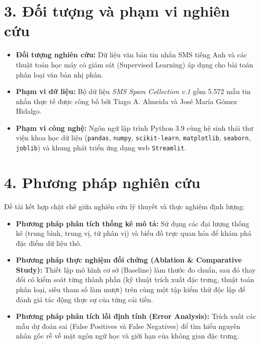 \documentclass[12pt,a4paper]{report}
\begin{document}
\section*{3. Đối tượng và phạm vi nghiên cứu}
\begin{itemize}
    \item \textbf{Đối tượng nghiên cứu:} Dữ liệu văn bản tin nhắn SMS tiếng Anh và các thuật toán học máy có giám sát (Supervised Learning) áp dụng cho bài toán phân loại văn bản nhị phân.
    \item \textbf{Phạm vi dữ liệu:} Bộ dữ liệu \textit{SMS Spam Collection v.1} gồm 5.572 mẫu tin nhắn thực tế được công bố bởi Tiago A. Almeida và José María Gómez Hidalgo.
    \item \textbf{Phạm vi công nghệ:} Ngôn ngữ lập trình Python 3.9 cùng hệ sinh thái thư viện khoa học dữ liệu (\texttt{pandas}, \texttt{numpy}, \texttt{scikit-learn}, \texttt{matplotlib}, \texttt{seaborn}, \texttt{joblib}) và khung phát triển ứng dụng web \texttt{Streamlit}.
\end{itemize}

\section*{4. Phương pháp nghiên cứu}
Đề tài kết hợp chặt chẽ giữa nghiên cứu lý thuyết và thực nghiệm định lượng:
\begin{itemize}
    \item \textbf{Phương pháp phân tích thống kê mô tả:} Sử dụng các đại lượng thống kê (trung bình, trung vị, tứ phân vị) và biểu đồ trực quan hóa để khám phá đặc điểm dữ liệu thô.
    \item \textbf{Phương pháp thực nghiệm đối chứng (Ablation \& Comparative Study):} Thiết lập mô hình cơ sở (Baseline) làm thước đo chuẩn, sau đó thay đổi có kiểm soát từng thành phần (kỹ thuật trích xuất đặc trưng, thuật toán phân loại, siêu tham số làm mượt) trên cùng một tập kiểm thử độc lập để đánh giá tác động thực sự của từng cải tiến.
    \item \textbf{Phương pháp phân tích lỗi định tính (Error Analysis):} Trích xuất các mẫu dự đoán sai (False Positives và False Negatives) để tìm hiểu nguyên nhân gốc rễ về mặt ngôn ngữ học và giới hạn của không gian đặc trưng.
\end{itemize}
\end{document}
